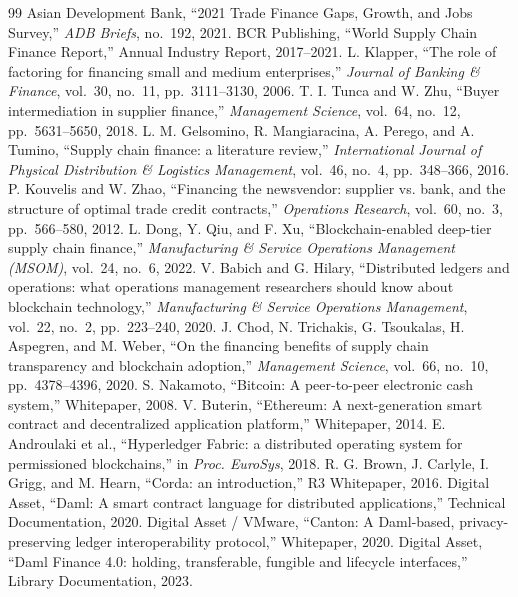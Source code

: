 \documentclass[10pt,twocolumn,letterpaper]{article}
\begin{document}
\begin{thebibliography}{99}
 Asian Development Bank, ``2021 Trade Finance Gaps, Growth, and Jobs Survey,'' \textit{ADB Briefs}, no.~192, 2021.
 BCR Publishing, ``World Supply Chain Finance Report,'' Annual Industry Report, 2017--2021.
 L. Klapper, ``The role of factoring for financing small and medium enterprises,'' \textit{Journal of Banking \& Finance}, vol.~30, no.~11, pp.~3111--3130, 2006.
 T. I. Tunca and W. Zhu, ``Buyer intermediation in supplier finance,'' \textit{Management Science}, vol.~64, no.~12, pp.~5631--5650, 2018.
 L. M. Gelsomino, R. Mangiaracina, A. Perego, and A. Tumino, ``Supply chain finance: a literature review,'' \textit{International Journal of Physical Distribution \& Logistics Management}, vol.~46, no.~4, pp.~348--366, 2016.
 P. Kouvelis and W. Zhao, ``Financing the newsvendor: supplier vs. bank, and the structure of optimal trade credit contracts,'' \textit{Operations Research}, vol.~60, no.~3, pp.~566--580, 2012.
 L. Dong, Y. Qiu, and F. Xu, ``Blockchain-enabled deep-tier supply chain finance,'' \textit{Manufacturing \& Service Operations Management (MSOM)}, vol.~24, no.~6, 2022.
 V. Babich and G. Hilary, ``Distributed ledgers and operations: what operations management researchers should know about blockchain technology,'' \textit{Manufacturing \& Service Operations Management}, vol.~22, no.~2, pp.~223--240, 2020.
 J. Chod, N. Trichakis, G. Tsoukalas, H. Aspegren, and M. Weber, ``On the financing benefits of supply chain transparency and blockchain adoption,'' \textit{Management Science}, vol.~66, no.~10, pp.~4378--4396, 2020.
 S. Nakamoto, ``Bitcoin: A peer-to-peer electronic cash system,'' Whitepaper, 2008.
 V. Buterin, ``Ethereum: A next-generation smart contract and decentralized application platform,'' Whitepaper, 2014.
 E. Androulaki et al., ``Hyperledger Fabric: a distributed operating system for permissioned blockchains,'' in \textit{Proc. EuroSys}, 2018.
 R. G. Brown, J. Carlyle, I. Grigg, and M. Hearn, ``Corda: an introduction,'' R3 Whitepaper, 2016.
 Digital Asset, ``Daml: A smart contract language for distributed applications,'' Technical Documentation, 2020.
 Digital Asset / VMware, ``Canton: A Daml-based, privacy-preserving ledger interoperability protocol,'' Whitepaper, 2020.
 Digital Asset, ``Daml Finance 4.0: holding, transferable, fungible and lifecycle interfaces,'' Library Documentation, 2023.

\end{thebibliography}
\end{document}
